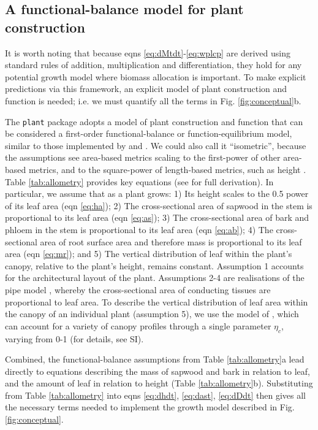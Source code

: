 \documentclass[9pt,twocolumn,twoside]{pnas-new}
\newcommand{\plant}{\texttt{plant}}
\begin{document}
\subsection{A functional-balance model for plant construction}

It is worth noting that because eqns \ref{eq:dMtdt}-\ref{eq:wplcp} are derived using standard rules of addition, multiplication and differentiation, they hold for any potential growth model where biomass allocation is important. To make explicit predictions via this framework, an explicit model of plant construction and function is needed; i.e. we must quantify all the terms in Fig. \ref{fig:conceptual}b.

The {\plant} package adopts a model of plant construction and function that can be considered a first-order functional-balance or function-equilibrium model, similar to those implemented by \citep{Makela-1997} and \citep{Moorcroft-2001}. We could also call it ``isometric'', because the assumptions see area-based metrics scaling to the first-power of other area-based metrics, and to the square-power of length-based metrics, such as height \citep{Huxley-1932}. Table \ref{tab:allometry} provides key equations (see \citep{Falster-2016} for full derivation). In particular, we assume that as a plant grows:
1) Its height scales to the 0.5 power of its leaf area (eqn \ref{eq:ha});
2) The cross-sectional area of sapwood in the stem is proportional to its leaf area (eqn \ref{eq:as});
3) The cross-sectional area of bark and phloem in the stem  is proportional to its leaf area (eqn \ref{eq:ab});
4) The cross-sectional area of root surface area and therefore mass is proportional to its leaf area (eqn \ref{eq:mr}); and
5) The vertical distribution of leaf within the plant's canopy, relative to the plant's height, remains constant.
Assumption 1 accounts for the architectural layout of the plant. Assumptions 2-4 are realisations of the pipe model \citep{Shinozaki-1964}, whereby the cross-sectional area of conducting tissues are proportional to leaf area. To describe the vertical distribution of leaf area within the canopy of an individual plant (assumption 5), we use the model of \citep{Yokozawa-1995}, which can account for a variety of canopy profiles through a single parameter $\eta_c$, varying from 0-1 (for details, see SI).

Combined, the functional-balance assumptions from Table \ref{tab:allometry}a lead directly to equations describing the mass of sapwood and bark in relation to leaf, and the amount of leaf in relation to height (Table \ref{tab:allometry}b). Substituting from Table \ref{tab:allometry} into eqns \ref{eq:dhdt}, \ref{eq:dast}, \ref{eq:dDdt} then gives all the necessary terms needed to implement the growth model described in Fig. \ref{fig:conceptual}.
\end{document}
